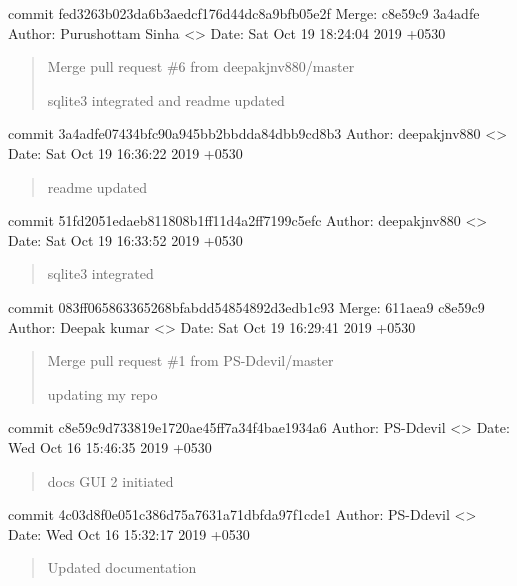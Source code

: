 \documentclass[letterpaper,10pt,english]{sphinxmanual}
\begin{document}
commit fed3263b023da6b3aedcf176d44dc8a9bfb05e2f
Merge: c8e59c9 3a4adfe
Author: Purushottam Sinha \textless{}\textgreater{}
Date:   Sat Oct 19 18:24:04 2019 +0530
\begin{quote}

Merge pull request \#6 from deepakjnv880/master

sqlite3 integrated and readme updated
\end{quote}

commit 3a4adfe07434bfc90a945bb2bbdda84dbb9cd8b3
Author: deepakjnv880 \textless{}\textgreater{}
Date:   Sat Oct 19 16:36:22 2019 +0530
\begin{quote}

readme updated
\end{quote}

commit 51fd2051edaeb811808b1ff11d4a2ff7199c5efc
Author: deepakjnv880 \textless{}\textgreater{}
Date:   Sat Oct 19 16:33:52 2019 +0530
\begin{quote}

sqlite3 integrated
\end{quote}

commit 083ff065863365268bfabdd54854892d3edb1c93
Merge: 611aea9 c8e59c9
Author: Deepak kumar \textless{}\textgreater{}
Date:   Sat Oct 19 16:29:41 2019 +0530
\begin{quote}

Merge pull request \#1 from PS-Ddevil/master

updating my repo
\end{quote}

commit c8e59c9d733819e1720ae45ff7a34f4bae1934a6
Author: PS-Ddevil \textless{}\textgreater{}
Date:   Wed Oct 16 15:46:35 2019 +0530
\begin{quote}

docs GUI 2 initiated
\end{quote}

commit 4c03d8f0e051c386d75a7631a71dbfda97f1cde1
Author: PS-Ddevil \textless{}\textgreater{}
Date:   Wed Oct 16 15:32:17 2019 +0530
\begin{quote}

Updated documentation
\end{quote}
\end{document}
